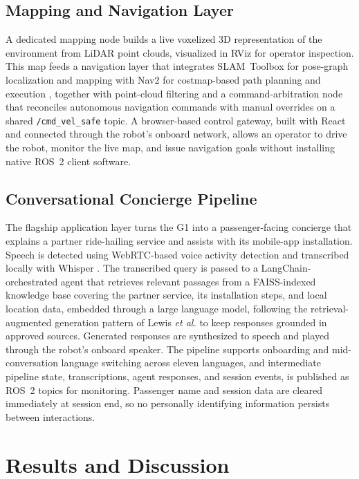 \documentclass[10pt,twocolumn]{article}
\begin{document}
\subsection{Mapping and Navigation Layer}
A dedicated mapping node builds a live voxelized 3D representation of the environment from LiDAR point clouds, visualized in RViz for operator inspection. This map feeds a navigation layer that integrates SLAM~Toolbox for pose-graph localization and mapping \cite{macenski2021slam} with Nav2 for costmap-based path planning and execution \cite{macenski2020nav2}, together with point-cloud filtering and a command-arbitration node that reconciles autonomous navigation commands with manual overrides on a shared \texttt{/cmd\_vel\_safe} topic. A browser-based control gateway, built with React and connected through the robot's onboard network, allows an operator to drive the robot, monitor the live map, and issue navigation goals without installing native ROS~2 client software.

\subsection{Conversational Concierge Pipeline}
The flagship application layer turns the G1 into a passenger-facing concierge that explains a partner ride-hailing service and assists with its mobile-app installation. Speech is detected using WebRTC-based voice activity detection and transcribed locally with Whisper \cite{radford2023whisper}. The transcribed query is passed to a LangChain-orchestrated agent that retrieves relevant passages from a FAISS-indexed knowledge base \cite{johnson2019faiss} covering the partner service, its installation steps, and local location data, embedded through a large language model, following the retrieval-augmented generation pattern of Lewis \emph{et al.} \cite{lewis2020rag} to keep responses grounded in approved sources. Generated responses are synthesized to speech and played through the robot's onboard speaker. The pipeline supports onboarding and mid-conversation language switching across eleven languages, and intermediate pipeline state, transcriptions, agent responses, and session events, is published as ROS~2 topics for monitoring. Passenger name and session data are cleared immediately at session end, so no personally identifying information persists between interactions.

\section{Results and Discussion}
\end{document}
